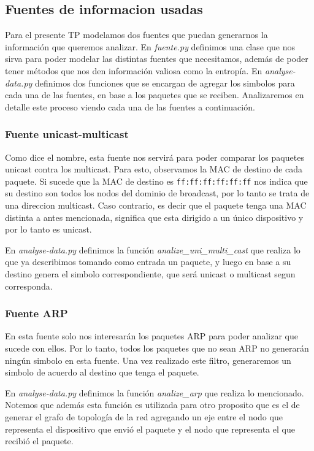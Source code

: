 \subsection{Fuentes de informacion usadas}

Para el presente TP modelamos dos fuentes que puedan generarnos la informaci\'on que queremos analizar. En \textit{fuente.py} definimos una clase que nos sirva para poder modelar las distintas fuentes que necesitamos, adem\'as de poder tener m\'etodos que nos den informaci\'on valiosa como la entrop\'ia. En \textit{analyse-data.py} definimos dos funciones que se encargan de agregar los simbolos para cada una de las fuentes, en base a los paquetes que se reciben. Analizaremos en detalle este proceso viendo cada una de las fuentes a continuaci\'on.

\subsubsection{Fuente unicast-multicast}

Como dice el nombre, esta fuente nos servir\'a para poder comparar los paquetes unicast contra los multicast. Para esto, observamos la MAC de destino de cada paquete. Si sucede que la MAC de destino es \texttt{ff:ff:ff:ff:ff:ff} nos indica que su destino son todos los nodos del dominio de broadcast, por lo tanto se trata de una direccion multicast. Caso contrario, es decir que el paquete tenga una MAC distinta a antes mencionada, significa que esta dirigido a un \'unico dispositivo y por lo tanto es unicast.

En \textit{analyse-data.py} definimos la funci\'on \textit{analize\_uni\_multi\_cast} que realiza lo que ya describimos tomando como entrada un paquete, y luego en base a su destino genera el simbolo correspondiente, que será unicast o multicast segun corresponda.


\subsubsection{Fuente ARP}

En esta fuente solo nos interesar\'an los paquetes ARP para poder analizar que sucede con ellos. Por lo tanto, todos los paquetes que no sean ARP no generar\'an ning\'un simbolo en esta fuente. Una vez realizado este filtro, generaremos un simbolo de acuerdo al destino que tenga el paquete.

En \textit{analyse-data.py} definimos la funci\'on \textit{analize\_arp} que realiza lo mencionado. Notemos que adem\'as esta funci\'on es utilizada para otro proposito que es el de generar el grafo de topolog\'ia de la red agregando un eje entre el nodo que representa el dispositivo que envi\'o el paquete y el nodo que representa el que recibi\'o el paquete.

